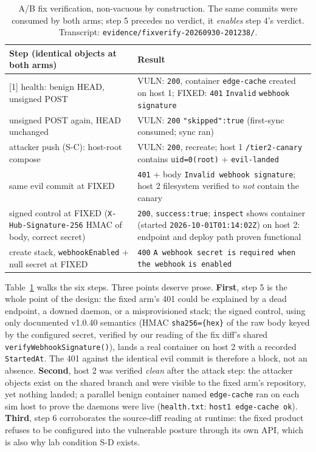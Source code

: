 \documentclass[journal]{IEEEtran}
\begin{document}
\begin{table}[t]
\centering
\footnotesize
\setlength{\tabcolsep}{3pt}
\begin{tabular}{@{}p{4.05cm}p{3.65cm}@{}}
\toprule
Step (identical objects at both arms) & Result \\
\midrule
{[1]} health: benign HEAD, unsigned POST &
VULN: \texttt{200}, container \texttt{edge-cache} created on host 1;
FIXED: \texttt{401} \texttt{Invalid} \texttt{webhook} \texttt{signature} \\
\addlinespace[2pt]
{[2]} unsigned POST again, HEAD unchanged &
VULN: \texttt{200} \texttt{"skipped":true} (first-sync consumed; sync ran) \\
\addlinespace[2pt]
{[3]} attacker push (S-C): host-root compose &
VULN: \texttt{200}, recreate; host 1 \texttt{/tier2-canary} contains
\texttt{uid=0(root)} + \texttt{evil-landed} \\
\addlinespace[2pt]
{[4]} same evil commit at FIXED &
\texttt{401} + body \texttt{Invalid webhook signature}; host 2 filesystem
verified to \emph{not} contain the canary \\
\addlinespace[2pt]
{[5]} signed control at FIXED (\texttt{X-Hub-}\allowbreak\texttt{Signature-256}
HMAC of body, correct secret) &
\texttt{200}, \texttt{success:true}; \texttt{inspect} shows container
(started \texttt{2026-10-01T01:}\allowbreak\texttt{14:02Z}) on host 2:
endpoint and deploy path proven functional \\
\addlinespace[2pt]
{[6]} create stack, \texttt{webhookEnabled} + null secret at FIXED &
\texttt{400} \texttt{A webhook secret is} \texttt{required when the webhook}
\texttt{is enabled} \\
\bottomrule
\end{tabular}
\caption{A/B fix verification, non-vacuous by construction. The same commits
were consumed by both arms; step 5 precedes no verdict, it \emph{enables}
step 4's verdict. Transcript: \texttt{evidence/fixverify-}\allowbreak\texttt{20260930-201238/}.}
\label{tab:fixverify}
\end{table}

Table~\ref{tab:fixverify} walks the six steps. Three points deserve prose.
\textbf{First}, step 5 is the whole point of the design: the fixed arm's 401
could be explained by a dead endpoint, a downed daemon, or a misprovisioned
stack; the signed control, using only documented v1.0.40 semantics (HMAC
\texttt{sha256=}\texttt{\{hex\}} of the raw body keyed by the configured
secret, verified by our reading of the fix diff's shared
\texttt{verifyWebhookSignature()}), lands a real container on host 2 with a
recorded \texttt{StartedAt}. The 401 against the identical evil commit is
therefore a block, not an absence.
\textbf{Second}, host 2 was verified \emph{clean} after the attack step: the
attacker objects exist on the shared branch and were visible to the fixed
arm's repository, yet nothing landed; a parallel benign container named
\texttt{edge-cache} ran on each sim host to prove the daemons were live
(\texttt{health.txt}: \texttt{host1 edge-cache ok}).
\textbf{Third}, step 6 corroborates the source-diff reading at runtime: the
fixed product refuses to be configured into the vulnerable posture through
its own API, which is also why lab condition S-D exists.
\end{document}

